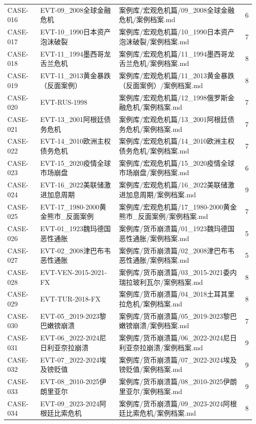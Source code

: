 \documentclass[UTF8,openany,oneside,11pt]{ctexbook}
\begin{document}
\begin{longtable}{L{1.5cm}L{3cm}L{10cm}r}
CASE-016 & EVT-09\_2008全球金融危机 & 案例库/宏观危机篇/09\_2008全球金融危机/案例档案.md & 6 \\
CASE-017 & EVT-10\_1990日本资产泡沫破裂 & 案例库/宏观危机篇/10\_1990日本资产泡沫破裂/案例档案.md & 7 \\
CASE-018 & EVT-11\_1994墨西哥龙舌兰危机 & 案例库/宏观危机篇/11\_1994墨西哥龙舌兰危机/案例档案.md & 8 \\
CASE-019 & EVT-11\_2013黄金暴跌（反面案例） & 案例库/宏观危机篇/11\_2013黄金暴跌（反面案例）/案例档案.md & 8 \\
CASE-020 & EVT-RUS-1998 & 案例库/宏观危机篇/12\_1998俄罗斯金融危机/案例档案.md & 7 \\
CASE-021 & EVT-13\_2001阿根廷债务危机 & 案例库/宏观危机篇/13\_2001阿根廷债务危机/案例档案.md & 7 \\
CASE-022 & EVT-14\_2010欧洲主权债务危机 & 案例库/宏观危机篇/14\_2010欧洲主权债务危机/案例档案.md & 7 \\
CASE-023 & EVT-15\_2020疫情全球市场崩盘 & 案例库/宏观危机篇/15\_2020疫情全球市场崩盘/案例档案.md & 6 \\
CASE-024 & EVT-16\_2022美联储激进加息周期 & 案例库/宏观危机篇/16\_2022美联储激进加息周期/案例档案.md & 9 \\
CASE-025 & EVT-17\_1980-2000黄金熊市\_反面案例 & 案例库/宏观危机篇/17\_1980-2000黄金熊市\_反面案例/案例档案.md & 7 \\
CASE-026 & EVT-01\_1923魏玛德国恶性通胀 & 案例库/货币崩溃篇/01\_1923魏玛德国恶性通胀/案例档案.md & 5 \\
CASE-027 & EVT-02\_2008津巴布韦恶性通胀 & 案例库/货币崩溃篇/02\_2008津巴布韦恶性通胀/案例档案.md & 5 \\
CASE-028 & EVT-VEN-2015-2021-FX & 案例库/货币崩溃篇/03\_2015-2021委内瑞拉玻利瓦尔/案例档案.md & 8 \\
CASE-029 & EVT-TUR-2018-FX & 案例库/货币崩溃篇/04\_2018土耳其里拉危机/案例档案.md & 8 \\
CASE-030 & EVT-05\_2019-2023黎巴嫩镑崩溃 & 案例库/货币崩溃篇/05\_2019-2023黎巴嫩镑崩溃/案例档案.md & 7 \\
CASE-031 & EVT-06\_2022-2024尼日利亚奈拉崩溃 & 案例库/货币崩溃篇/06\_2022-2024尼日利亚奈拉崩溃/案例档案.md & 9 \\
CASE-032 & EVT-07\_2022-2024埃及镑贬值 & 案例库/货币崩溃篇/07\_2022-2024埃及镑贬值/案例档案.md & 9 \\
CASE-033 & EVT-08\_2010-2025伊朗里亚尔 & 案例库/货币崩溃篇/08\_2010-2025伊朗里亚尔/案例档案.md & 9 \\
CASE-034 & EVT-09\_2023-2024阿根廷比索危机 & 案例库/货币崩溃篇/09\_2023-2024阿根廷比索危机/案例档案.md & 8 \\

\end{longtable}
\end{document}
